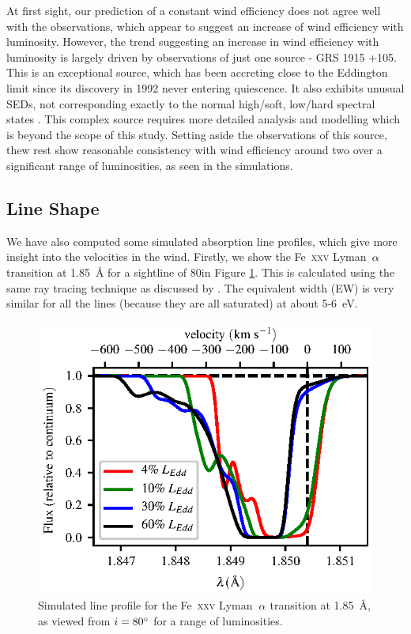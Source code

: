 \documentclass[a4paper,fleqn,usenatbib]{mnras}
\begin{document}
At first sight, our prediction of a constant wind efficiency does not
agree well with the observations, which appear to suggest an increase of wind efficiency with
luminosity. However, the trend suggesting an increase in wind efficiency with luminosity is largely driven 
by observations of just one source - GRS 1915 +105.  This is an exceptional source, which has been 
accreting close to the Eddington limit since its discovery in 1992 \citep{1994ApJS...92..469C,
2017MNRAS.468.4748C} never
entering quiescence. It also exhibits unusual SEDs, not corresponding exactly to the normal high/soft,
low/hard spectral states \cite{2016ApJ...833..165Z}. This complex source requires more detailed
analysis and modelling which is beyond the scope of this study. Setting aside the observations of this
source, thew rest show reasonable consistency with wind efficiency around two over a significant 
range of luminosities, as seen in the simulations.

\subsection{Line Shape}
We have also computed some simulated absorption line profiles, which give more insight into the velocities 
in the wind.
Firstly, we show the Fe~\textsc{xxv} Lyman~$\rm{\alpha}$ transition at 1.85~{\AA} for a sightline 
of 80\degree in Figure \ref{figure:line25}. This is calculated using the same ray tracing technique as discussed 
by \cite{2015ApJ...807..107H}. The equivalent width (EW) is very similar for all the lines (because they are all 
saturated) at about 5-6~eV. 

\begin{figure}
\includegraphics[width=\columnwidth]{figures/80_degrees_fe25.eps}
\caption{Simulated line profile for the Fe~\textsc{xxv} Lyman~$\rm{\alpha}$
transition at 1.85~{\AA}, as viewed from $i = 80\degree$ for a range
of luminosities.}
\label{figure:line25}
\end{figure}
\end{document}

